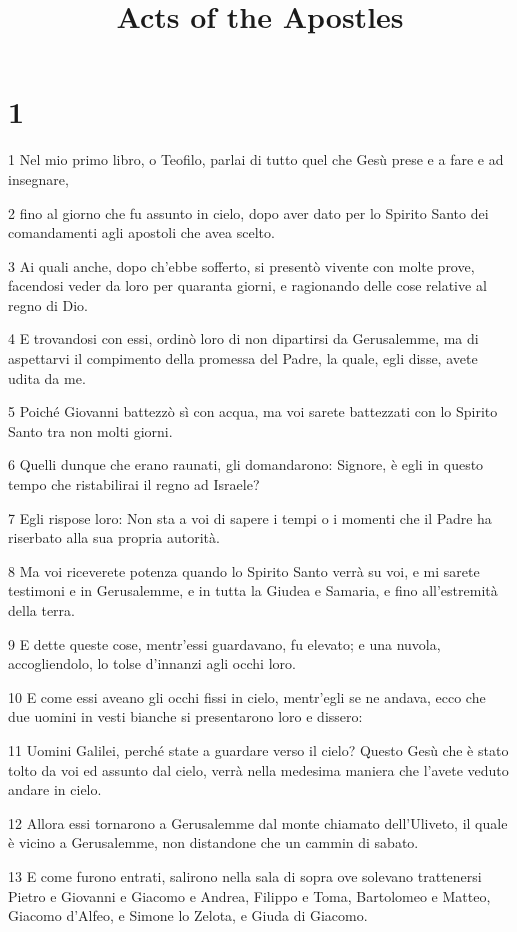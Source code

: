 

\title{Acts of the Apostles}


\chapter{1}

\par 1 Nel mio primo libro, o Teofilo, parlai di tutto quel che Gesù prese e a fare e ad insegnare,
\par 2 fino al giorno che fu assunto in cielo, dopo aver dato per lo Spirito Santo dei comandamenti agli apostoli che avea scelto.
\par 3 Ai quali anche, dopo ch'ebbe sofferto, si presentò vivente con molte prove, facendosi veder da loro per quaranta giorni, e ragionando delle cose relative al regno di Dio.
\par 4 E trovandosi con essi, ordinò loro di non dipartirsi da Gerusalemme, ma di aspettarvi il compimento della promessa del Padre, la quale, egli disse, avete udita da me.
\par 5 Poiché Giovanni battezzò sì con acqua, ma voi sarete battezzati con lo Spirito Santo tra non molti giorni.
\par 6 Quelli dunque che erano raunati, gli domandarono: Signore, è egli in questo tempo che ristabilirai il regno ad Israele?
\par 7 Egli rispose loro: Non sta a voi di sapere i tempi o i momenti che il Padre ha riserbato alla sua propria autorità.
\par 8 Ma voi riceverete potenza quando lo Spirito Santo verrà su voi, e mi sarete testimoni e in Gerusalemme, e in tutta la Giudea e Samaria, e fino all'estremità della terra.
\par 9 E dette queste cose, mentr'essi guardavano, fu elevato; e una nuvola, accogliendolo, lo tolse d'innanzi agli occhi loro.
\par 10 E come essi aveano gli occhi fissi in cielo, mentr'egli se ne andava, ecco che due uomini in vesti bianche si presentarono loro e dissero:
\par 11 Uomini Galilei, perché state a guardare verso il cielo? Questo Gesù che è stato tolto da voi ed assunto dal cielo, verrà nella medesima maniera che l'avete veduto andare in cielo.
\par 12 Allora essi tornarono a Gerusalemme dal monte chiamato dell'Uliveto, il quale è vicino a Gerusalemme, non distandone che un cammin di sabato.
\par 13 E come furono entrati, salirono nella sala di sopra ove solevano trattenersi Pietro e Giovanni e Giacomo e Andrea, Filippo e Toma, Bartolomeo e Matteo, Giacomo d'Alfeo, e Simone lo Zelota, e Giuda di Giacomo.
